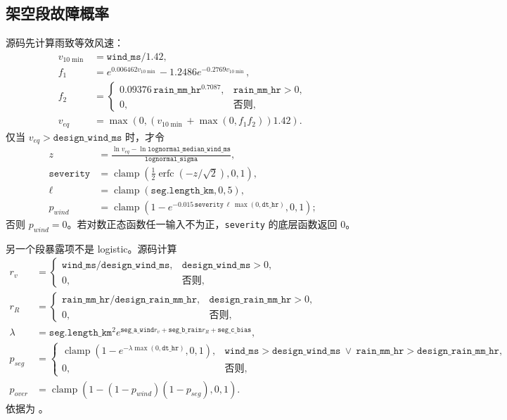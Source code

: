 \subsection{架空段故障概率}

源码先计算雨致等效风速：
\begin{align}
 v_{10\min}&=\texttt{wind\_ms}/1.42,\\
 f_1&=e^{0.006462v_{10\min}}-1.2486e^{-0.2769v_{10\min}},\\
 f_2&=\begin{cases}0.09376\,\texttt{rain\_mm\_hr}^{0.7087},&\texttt{rain\_mm\_hr}>0,\\0,&\text{否则},\end{cases}\\
 v_{eq}&=\max(0,(v_{10\min}+\max(0,f_1f_2))1.42).
\end{align}
仅当 $v_{eq}>\texttt{design\_wind\_ms}$ 时，才令
\begin{align}
 z&=\frac{\ln v_{eq}-\ln\texttt{lognormal\_median\_wind\_ms}}
          {\texttt{lognormal\_sigma}},\\
 \texttt{severity}&=\operatorname{clamp}\!\left(\tfrac12
       \operatorname{erfc}(-z/\sqrt2),0,1\right),\\
 \ell&=\operatorname{clamp}(\texttt{seg.length\_km},0,5),\\
 p_{wind}&=\operatorname{clamp}\!\left(1-e^{-0.015\,
       \texttt{severity}\,\ell\,\max(0,\texttt{dt\_hr})},0,1\right);
\end{align}
否则 $p_{wind}=0$。若对数正态函数任一输入不为正，\texttt{severity} 的底层函数返回 0。

另一个段暴露项不是 logistic。源码计算
\begin{align}
 r_v&=\begin{cases}\texttt{wind\_ms}/\texttt{design\_wind\_ms},&
 \texttt{design\_wind\_ms}>0,\\0,&\text{否则},\end{cases}\\
 r_R&=\begin{cases}\texttt{rain\_mm\_hr}/\texttt{design\_rain\_mm\_hr},&
 \texttt{design\_rain\_mm\_hr}>0,\\0,&\text{否则},\end{cases}\\
 \lambda&=\texttt{seg.length\_km}^{2}
 e^{\texttt{seg\_a\_wind}r_v+\texttt{seg\_b\_rain}r_R+\texttt{seg\_c\_bias}},\\
 p_{seg}&=\begin{cases}
 \operatorname{clamp}(1-e^{-\lambda\max(0,\texttt{dt\_hr})},0,1),&
 \texttt{wind\_ms}>\texttt{design\_wind\_ms}\ \lor\
 \texttt{rain\_mm\_hr}>\texttt{design\_rain\_mm\_hr},\\
 0,&\text{否则},
 \end{cases}\\
 p_{over}&=\operatorname{clamp}(1-(1-p_{wind})(1-p_{seg}),0,1).
\end{align}
依据为 。

